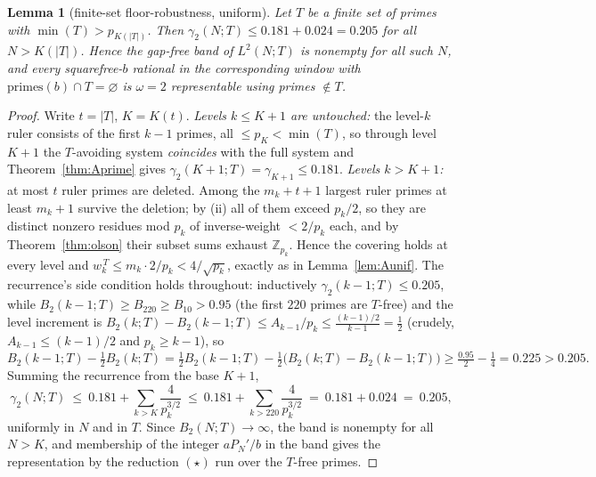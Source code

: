 \documentclass[11pt]{amsart}
\theoremstyle{plain}
\newtheorem{lemma}[theorem]{Lemma}
\theoremstyle{definition}
\newcommand{\Z}{\mathbb{Z}}
\begin{document}
\begin{lemma}[finite-set floor-robustness, uniform]\label{lem:finiteT}
Let $T$ be a finite set of primes with $\min(T)>p_{K(|T|)}$.  Then
$\gamma_2(N;T)\le0.181+0.024=0.205$ for all $N>K(|T|)$.  Hence the gap-free band of
$L^2(N;T)$ is nonempty for all such
$N$, and every squarefree-$b$ rational in the corresponding window with
$\mathrm{primes}(b)\cap T=\varnothing$ is $\omega=2$ representable using primes
$\notin T$.
\end{lemma}
\begin{proof}
Write $t=|T|$, $K=K(t)$.  \emph{Levels $k\le K+1$ are untouched:} the level-$k$
ruler consists of the first $k-1$ primes, all $\le p_K<\min(T)$, so through level
$K+1$ the $T$-avoiding system \emph{coincides} with the full system and
Theorem~\ref{thm:Aprime} gives $\gamma_2(K+1;T)=\gamma_{K+1}\le0.181$.
\emph{Levels $k>K+1$:} at most $t$ ruler primes are deleted.  Among the
$m_k+t+1$ largest ruler primes at least $m_k+1$ survive the deletion; by (ii) all
of them exceed $p_k/2$, so they are distinct nonzero residues mod $p_k$ of
inverse-weight $<2/p_k$ each, and by Theorem~\ref{thm:olson} their
subset sums exhaust $\Z_{p_k}$.  Hence the covering holds at every level and
$w_k^{\,T}\le m_k\cdot2/p_k<4/\sqrt{p_k}$, exactly as in Lemma~\ref{lem:Aunif}.
The recurrence's side condition holds throughout: inductively
$\gamma_2(k-1;T)\le0.205$, while $B_2(k-1;T)\ge B_{220}\ge B_{10}>0.95$ (the
first $220$ primes are $T$-free) and the level increment is
$B_2(k;T)-B_2(k-1;T)\le A_{k-1}/p_k\le\tfrac{(k-1)/2}{k-1}=\tfrac12$ (crudely,
$A_{k-1}\le(k-1)/2$ and $p_k\ge k-1$), so
\[
  B_2(k-1;T)-\tfrac12B_2(k;T)
  =\tfrac12B_2(k-1;T)-\tfrac12\bigl(B_2(k;T)-B_2(k-1;T)\bigr)
  \ge\tfrac{0.95}2-\tfrac14=0.225>0.205 .
\]  Summing the recurrence from the base $K+1$,
\[
  \gamma_2(N;T)\ \le\ 0.181+\sum_{k>K}\frac{4}{p_k^{3/2}}
  \ \le\ 0.181+\sum_{k>220}\frac{4}{p_k^{3/2}}\ =\ 0.181+0.024\ =\ 0.205 ,
\]
uniformly in $N$ and in $T$.  Since $B_2(N;T)\to\infty$, the band is nonempty for
all $N>K$, and membership of the integer $aP_N'/b$ in the band gives the
representation by the reduction $(\star)$ run over the $T$-free primes.
\end{proof}
\end{document}
